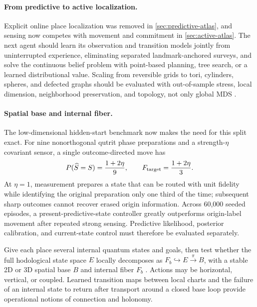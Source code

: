 \documentclass[11pt]{article}
\begin{document}
\paragraph{From predictive to active localization.}
Explicit online place localization was removed in
\cref{sec:predictive-atlas}, and sensing now competes with movement and
commitment in \cref{sec:active-atlas}. The next agent should learn its
observation and transition models jointly from uninterrupted experience,
eliminating separated landmark-anchored surveys, and solve the continuous
belief problem with point-based planning, tree search, or a learned
distributional value. Scaling from reversible grids to tori, cylinders,
spheres, and defected graphs should be evaluated with out-of-sample stress,
local dimension, neighborhood preservation, and topology, not only global MDS
\cite{tenenbaum2000}.

\paragraph{Spatial base and internal fiber.}
The low-dimensional hidden-start benchmark now makes the need for this split
exact. For nine nonorthogonal qutrit phase preparations and a strength-$\eta$
covariant sensor, a single outcome-directed move has
\begin{equation}
 P(\widehat S=S)=\frac{1+2\eta}{9},\qquad
 F_{\rm target}=\frac{1+2\eta}{3}.
 \label{eq:localization-preparation-gap}
\end{equation}
At $\eta=1$, measurement prepares a state that can be routed with unit
fidelity while identifying the original preparation only one third of the
time; subsequent sharp outcomes cannot recover erased origin information.
Across 60,000 seeded episodes, a present-predictive-state controller greatly
outperforms origin-label movement after repeated strong sensing. Predictive
likelihood, posterior calibration, and current-state control must therefore be
evaluated separately.

Give each place several internal quantum states and goals, then test whether
the full hodological state space $E$ locally decomposes as
$F_b\hookrightarrow E\xrightarrow{\pi}B$, with a stable 2D or 3D spatial base
$B$ and internal fiber $F_b$ \cite{steenrod1951}. Actions may be horizontal,
vertical, or coupled. Learned transition maps between local charts and the
failure of an internal state to return after transport around a closed base
loop provide operational notions of connection and holonomy.
\end{document}
